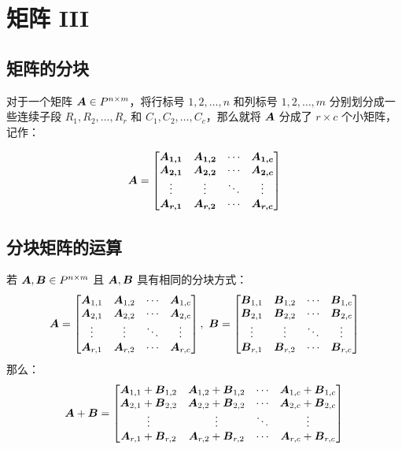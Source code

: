 \section{矩阵 III}

\subsection{矩阵的分块}

对于一个矩阵 $\boldsymbol{A} \in P^{n \times m}$，将行标号 $1, 2, \dots, n$ 和列标号 $1, 2, \dots, m$ 分别划分成一些连续子段 $R_1, R_2, \dots, R_r$ 和 $C_1, C_2, \dots, C_c$，那么就将 $\boldsymbol{A}$ 分成了 $r \times c$ 个小矩阵，记作：

$$
\boldsymbol{A} = \begin{bmatrix}
	\boldsymbol{A_{1,1}} & \boldsymbol{A_{1,2}} & \cdots & \boldsymbol{A_{1,c}} \\
	\boldsymbol{A_{2,1}} & \boldsymbol{A_{2,2}} & \cdots & \boldsymbol{A_{2,c}} \\
	\vdots & \vdots & \ddots & \vdots \\
	\boldsymbol{A_{r,1}} & \boldsymbol{A_{r,2}} & \cdots & \boldsymbol{A_{r,c}}
\end{bmatrix}
$$

\subsection{分块矩阵的运算}

\begin{definition}[分块矩阵的加法]
	若 $\boldsymbol{A}, \boldsymbol{B} \in P^{n \times m}$ 且 $\boldsymbol{A}, \boldsymbol{B}$ 具有相同的分块方式：
	$$
	\matr{A} = \begin{bmatrix}
		\matr{A}_{1,1} & \matr{A}_{1,2} & \cdots & \matr{A}_{1,c} \\
		\matr{A}_{2,1} & \matr{A}_{2,2} & \cdots & \matr{A}_{2,c} \\
		\vdots & \vdots & \ddots & \vdots \\
		\matr{A}_{r,1} & \matr{A}_{r,2} & \cdots & \matr{A}_{r,c}
	\end{bmatrix},\ 
	\matr{B} = \begin{bmatrix}
		\matr{B}_{1,1} & \matr{B}_{1,2} & \cdots & \matr{B}_{1,c} \\
		\matr{B}_{2,1} & \matr{B}_{2,2} & \cdots & \matr{B}_{2,c} \\
		\vdots & \vdots & \ddots & \vdots \\
		\matr{B}_{r,1} & \matr{B}_{r,2} & \cdots & \matr{B}_{r,c}
	\end{bmatrix}
	$$
	那么：
	$$
	\boldsymbol{A} + \boldsymbol{B} = \begin{bmatrix}
		\boldsymbol{A}_{1,1} + \boldsymbol{B}_{1,2} & \boldsymbol{A}_{1,2} + \boldsymbol{B}_{1,2} & \cdots & \boldsymbol{A}_{1,c} + \boldsymbol{B}_{1,c} \\
		\boldsymbol{A}_{2,1} + \boldsymbol{B}_{2,2} & \boldsymbol{A}_{2,2} + \boldsymbol{B}_{2,2} & \cdots & \boldsymbol{A}_{2,c} + \boldsymbol{B}_{2,c} \\
		\vdots & \vdots & \ddots & \vdots \\
		\boldsymbol{A}_{r,1} + \boldsymbol{B}_{r,2} & \boldsymbol{A}_{r,2} + \boldsymbol{B}_{r,2} & \cdots & \boldsymbol{A}_{r,c} + \boldsymbol{B}_{r,c}
	\end{bmatrix}
	$$
\end{definition}

